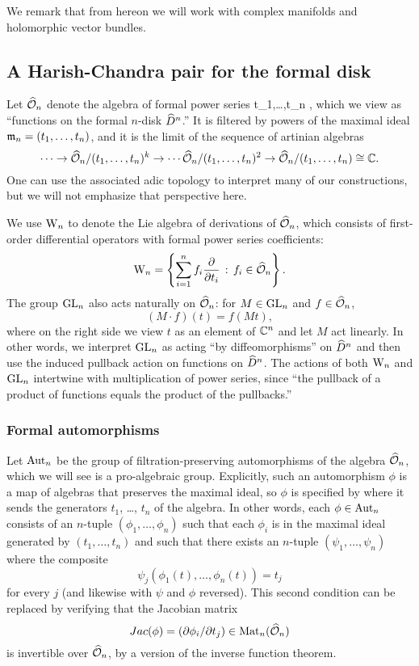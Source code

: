 We remark that from hereon we will work with complex manifolds and holomorphic vector bundles.
 
\subsection{A Harish-Chandra pair for the formal disk}

Let $\widehat{\mathcal O}_n$ denote the algebra of formal power series 
\ben
\CC \llbracket t_1,\ldots,t_n \rrbracket,
\een 
which we view as ``functions on the formal $n$-disk $\widehat{D}^n$.'' 
It is filtered by powers of the maximal ideal ${\mathfrak m}_n = (t_1,\ldots,t_n)$, and it is the limit of the sequence of artinian algebras
\[
\cdots \to \widehat{\mathcal O}_n/(t_1,\ldots,t_n)^k \to \cdots \widehat{\mathcal O}_n/(t_1,\ldots,t_n)^2 \to \widehat{\mathcal O}_n/(t_1,\ldots,t_n) \cong \mathbb C.
\] 
One can use the associated adic topology to interpret many of our constructions, but we will not emphasize that perspective here.

We use ${{\rm W}_n}$ to denote the Lie algebra of derivations of $\widehat{\mathcal O}_n$, which consists of first-order differential operators with formal power series coefficients:
\[
{{\rm W}_n} = \left\{ \sum_{i =1 }^n f_i \frac{\partial}{\partial t_i} \,:\, f_i \in \widehat{\mathcal O}_n\right\}.
\]
The group ${\rm GL}_n$ also acts naturally on $\widehat{\mathcal O}_n$: for $M \in {\rm GL}_n$ and $f \in \widehat{\mathcal O}_n$,
\[
(M \cdot f)(t) = f (Mt),
\]
where on the right side we view $t$ as an element of $\mathbb C^n$ and let $M$ act linearly.
In other words, we interpret ${\rm GL}_n$ as acting ``by diffeomorphisms'' on $\widehat{D}^n$ and then use the induced pullback action on functions on $\widehat{D}^n$.
The actions of both ${{\rm W}_n}$ and ${\rm GL}_n$ intertwine with multiplication of power series, 
since ``the pullback of a product of functions equals the product of the pullbacks.''

\subsubsection{Formal automorphisms}

Let ${\rm Aut}_n$ be the group of filtration-preserving automorphisms of the algebra $\widehat{\mathcal O}_n$,
which we will see is a pro-algebraic group.
Explicitly, such an automorphism $\phi$ is a map of algebras that preserves the maximal ideal, 
so $\phi$ is specified by where it sends the generators $t_1$, \dots, $t_n$ of the algebra.
In other words, each $\phi \in {\rm Aut}_n$ consists of an $n$-tuple $(\phi_1,\ldots,\phi_n)$ 
such that each $\phi_i$ is in the maximal ideal generated by $(t_1,\ldots,t_n)$ and such that there exists an $n$-tuple $(\psi_1,\ldots,\psi_n)$ 
where the composite
\[
\psi_j(\phi_1(t),\ldots,\phi_n(t)) = t_j
\]
for every $j$ (and likewise with $\psi$ and $\phi$ reversed).
This second condition can be replaced by verifying that the Jacobian matrix
\[
Jac(\phi) = (\partial \phi_i/\partial t_j) \in {\rm Mat}_n(\widehat{\mathcal O}_n)
\]
is invertible over $\widehat{\mathcal O}_n$, by a version of the inverse function theorem.

